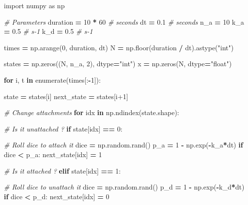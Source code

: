 \documentclass[12pt,a4paper,twoside,openright]{book}
\newenvironment{Shaded}{\begin{snugshade}}{\end{snugshade}}
\newcommand{\DecValTok}[1]{\textcolor[rgb]{0.00,0.00,0.81}{{#1}}}
\newcommand{\FloatTok}[1]{\textcolor[rgb]{0.00,0.00,0.81}{{#1}}}
\newcommand{\StringTok}[1]{\textcolor[rgb]{0.31,0.60,0.02}{{#1}}}
\newcommand{\ImportTok}[1]{{#1}}
\newcommand{\CommentTok}[1]{\textcolor[rgb]{0.56,0.35,0.01}{\textit{{#1}}}}
\newcommand{\ControlFlowTok}[1]{\textcolor[rgb]{0.13,0.29,0.53}{\textbf{{#1}}}}
\newcommand{\OperatorTok}[1]{\textcolor[rgb]{0.81,0.36,0.00}{\textbf{{#1}}}}
\newcommand{\BuiltInTok}[1]{{#1}}
\newcommand{\NormalTok}[1]{{#1}}
\begin{document}
\begin{Shaded}
\begin{Highlighting}[]
\ImportTok{import} \NormalTok{numpy }\ImportTok{as} \NormalTok{np}

\CommentTok{# Parameters}
\NormalTok{duration }\OperatorTok{=} \DecValTok{10} \OperatorTok{*} \DecValTok{60}  \CommentTok{# seconds}
\NormalTok{dt }\OperatorTok{=} \FloatTok{0.1}  \CommentTok{# seconds}
\NormalTok{n_a }\OperatorTok{=} \DecValTok{10}
\NormalTok{k_a }\OperatorTok{=} \FloatTok{0.5}  \CommentTok{# s-1}
\NormalTok{k_d }\OperatorTok{=} \FloatTok{0.5}  \CommentTok{# s-1}

\NormalTok{times }\OperatorTok{=} \NormalTok{np.arange(}\DecValTok{0}\NormalTok{, duration, dt)}
\NormalTok{N }\OperatorTok{=} \NormalTok{np.floor(duration }\OperatorTok{/} \NormalTok{dt).astype(}\StringTok{"int"}\NormalTok{)}

\NormalTok{states }\OperatorTok{=} \NormalTok{np.zeros((N, n_a, }\DecValTok{2}\NormalTok{), dtype}\OperatorTok{=}\StringTok{"int"}\NormalTok{)}
\NormalTok{x }\OperatorTok{=} \NormalTok{np.zeros(N, dtype}\OperatorTok{=}\StringTok{"float"}\NormalTok{)}

\ControlFlowTok{for} \NormalTok{i, t }\OperatorTok{in} \BuiltInTok{enumerate}\NormalTok{(times[:}\OperatorTok{-}\DecValTok{1}\NormalTok{]):}

    \NormalTok{state }\OperatorTok{=} \NormalTok{states[i]}
    \NormalTok{next_state }\OperatorTok{=} \NormalTok{states[i}\DecValTok{+1}\NormalTok{]}

    \CommentTok{# Change attachments}
    \ControlFlowTok{for} \NormalTok{idx }\OperatorTok{in} \NormalTok{np.ndindex(state.shape):}

        \CommentTok{# Is it unattached ?}
        \ControlFlowTok{if} \NormalTok{state[idx] }\OperatorTok{==} \DecValTok{0}\NormalTok{:}

            \CommentTok{# Roll dice to attach it}
            \NormalTok{dice }\OperatorTok{=} \NormalTok{np.random.rand()}
            \NormalTok{p_a }\OperatorTok{=} \DecValTok{1} \OperatorTok{-} \NormalTok{np.exp(}\OperatorTok{-}\NormalTok{k_a}\OperatorTok{*}\NormalTok{dt)}
            \ControlFlowTok{if}  \NormalTok{dice }\OperatorTok{<} \NormalTok{p_a:}
                \NormalTok{next_state[idx] }\OperatorTok{=} \DecValTok{1}

        \CommentTok{# Is it attached ?}
        \ControlFlowTok{elif} \NormalTok{state[idx] }\OperatorTok{==} \DecValTok{1}\NormalTok{:}

            \CommentTok{# Roll dice to unattach it}
            \NormalTok{dice }\OperatorTok{=} \NormalTok{np.random.rand()}
            \NormalTok{p_d }\OperatorTok{=} \DecValTok{1} \OperatorTok{-} \NormalTok{np.exp(}\OperatorTok{-}\NormalTok{k_d}\OperatorTok{*}\NormalTok{dt)}
            \ControlFlowTok{if}  \NormalTok{dice }\OperatorTok{<} \NormalTok{p_d:}
                \NormalTok{next_state[idx] }\OperatorTok{=} \DecValTok{0}


\end{Highlighting}
\end{Shaded}
\end{document}
